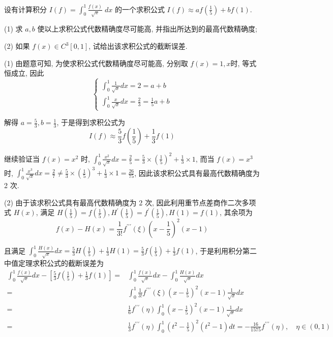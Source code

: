  
\begin{tcolorbox}[enhanced,colback=10,colframe=9,breakable,coltitle=green!25!black,title=2024]

 设有计算积分 $ I(f)=\displaystyle\int_{0}^{1} \frac{f(x)}{\sqrt{x}} \; d x $ 的一个求积公式 $ I(f) \approx a f\left(\frac{1}{5}\right)+ bf  (1)$.
 
(1) 求 $ a, b $ 使以上求积公式代数精确度尽可能高, 并指出所达到的最高代数精确度;

(2) 如果 $ f(x) \in C^{3}[0,1] $, 试给出该求积公式的截断误差.
\tcblower

 (1) 由题意可知, 为使求积公式代数精确度尽可能高, 分别取 $ f(x)=1, x $时, 等式恒成立, 因此
$$
\left\{\begin{array}{l}
\int_{0}^{1} \frac{1}{\sqrt{x}} d x=2=a+b \\
\int_{0}^{1} \frac{x}{\sqrt{x}} d x=\frac{2}{3}=\frac{1}{5} a+b
\end{array}\right.
$$

解得 $ a=\frac{5}{3}, b=\frac{1}{3} $, 于是得到求积公式为
$$
I(f) \approx \frac{5}{3} f\left(\frac{1}{5}\right)+\frac{1}{3} f(1)
$$

继续验证当 $ f(x)=x^{2} $ 时, $ \int_{0}^{1} \frac{x^{2}}{\sqrt{x}} d x=\frac{2}{5}=\frac{5}{3} \times\left(\frac{1}{5}\right)^{2}+\frac{1}{3} \times 1 $, 而当 $ f(x)=x^{3} $时, $ \int_{0}^{1} \frac{x^{3}}{\sqrt{x}} d x=\frac{2}{7} \neq \frac{5}{3} \times\left(\frac{1}{5}\right)^{3}+\frac{1}{3} \times 1=\frac{26}{75} $, 因此该求积公式具有最高代数精确度为 2 次.

(2) 由于该求积公式具有最高代数精确度为 2 次, 因此利用重节点差商作二次多项式 $ H(x) $, 满足 $ H\left(\frac{1}{5}\right)=f\left(\frac{1}{5}\right), H^{\prime}\left(\frac{1}{5}\right)=f^{\prime}\left(\frac{1}{5}\right), H(1)=f(1) $, 其余项为
$$
f(x)-H(x)=\frac{1}{3!} f^{\prime \prime \prime}(\xi)\left(x-\frac{1}{5}\right)^{2}(x-1)
$$

且满足 $ \int_{0}^{1} \frac{H(x)}{\sqrt{x}} d x=\frac{5}{3} H\left(\frac{1}{5}\right)+\frac{1}{3} H(1)=\frac{5}{3} f\left(\frac{1}{5}\right)+\frac{1}{3} f(1) $, 于是利用积分第二中值定理求积公式的截断误差为
$$
\begin{aligned}
 \int_{0}^{1} \frac{f(x)}{\sqrt{x}} d x-\left[\frac{5}{3} f\left(\frac{1}{5}\right)+\frac{1}{3} f(1)\right] 
= & \int_{0}^{1} \frac{f(x)}{\sqrt{x}} d x-\int_{0}^{1} \frac{H(x)}{\sqrt{x}} d x\\
=&\int_{0}^{1} \frac{1}{3!} f^{\prime \prime \prime}(\xi)\left(x-\frac{1}{5}\right)^{2}(x-1) \frac{1}{\sqrt{x}} d x \\
=&\frac{1}{6} f^{\prime \prime \prime}(\eta) \int_{0}^{1}\left(x-\frac{1}{5}\right)^{2}(x-1) \frac{1}{\sqrt{x}} d x \\
=&\frac{1}{3} f^{\prime \prime \prime}(\eta) \int_{0}^{1}\left(t^{2}-\frac{1}{5}\right)^{2}\left(t^{2}-1\right) d t=-\frac{16}{1575} f^{\prime \prime \prime}(\eta), \quad \eta \in(0,1)
\end{aligned}
$$
\end{tcolorbox}



